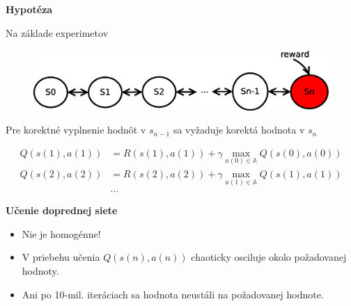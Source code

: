 \documentclass[xcolor=dvipsnames]{beamer}
\begin{document}
\begin{frame}{\bf Hypotéza}

Na základe experimetov

\begin{figure}[!htb]
\includegraphics[scale=.5]{../diagrams/q_chain_problem.eps}
\end{figure}

Pre korektné vyplnenie hodnôt v $s_{n-1}$ sa vyžaduje korektá hodnota v $s_{n}$

\begin{align*}
    Q(s(1),a(1)) &= R(s(1),a(1)) + \gamma \max_{a(0) \in \mathbb{A}} Q(s(0), a(0)) \\
    Q(s(2),a(2)) &= R(s(2),a(2)) + \gamma \max_{a(1) \in \mathbb{A}} Q(s(1), a(1)) \\
    & \dots
\end{align*}

\end{frame}



\begin{frame}{\bf Učenie doprednej siete}

\begin{itemize}
 \item Nie je homogénne! \\
 \item V priebehu učenia $Q(s(n),a(n))$ chaoticky osciluje okolo požadovanej hodnoty. \\
 \item Ani po 10-mil. iteráciach sa hodnota neustáli na požadovanej hodnote.
\end{itemize}

\end{frame}
\end{document}
